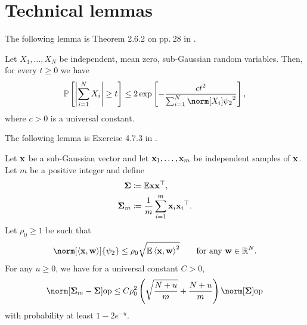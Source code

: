 \section{Technical lemmas}

The following lemma is Theorem 2.6.2 on pp.$\ $28 in \citet{vershynin2017high}.
\begin{lem}
\emph{ \label{lem:hoeffding} }Let $X_{1},\ldots,X_{N}$ be independent,
mean zero, sub-Gaussian random variables. Then, for every $t\geq0$
we have 
\[
\P\left[\left|\sum_{i=1}^{N}X_{i}\right|\geq t\right]\leq2\exp\left[-\frac{ct^{2}}{\sum_{i=1}^{N}\norm[X_{i}]{\psi_{2}}^{2}}\right],
\]
where $c>0$ is a universal constant.
\end{lem}
The following lemma is Exercise 4.7.3 in \citet{vershynin2017high}.
\begin{lem}
\emph{ }\label{lem:subg_cov_mat_bound} Let $\mathbf{x}$ be a sub-Gaussian
vector and let $\mathbf{x}_{1},\ldots,\mathbf{x}_{m}$ be independent samples of $\mathbf{x}$.
Let $m$ be a positive integer and define 
\begin{align*}
\boldsymbol{\Sigma} & \coloneqq\mathbb{E}\mathbf{x}\mathbf{x}{\displaystyle ^{\top}},\\
\boldsymbol{\Sigma}_{m} & \coloneqq\frac{1}{m}\sum_{i=1}^{m}\mathbf{x}_{i}\mathbf{x}_{i}{\displaystyle ^{\top}}.
\end{align*}
Let $\rho_{0}\ge1$ be such that 
\[
\norm[\left\langle \x,\w\right\rangle ]{\psi_{2}}\leq\rho_{0}\sqrt{\E\left\langle \x,\w\right\rangle ^{2}}\qquad\text{for any }\w\in\real^{N}.
\]
For any $u\geq0$, we have for a universal constant $C>0$, 
\[
\opnorm{\boldsymbol{\Sigma}_{m}-\boldsymbol{\Sigma}}\leq C\rho_{0}^{2}\left(\sqrt{\frac{N+u}{m}}+\frac{N+u}{m}\right)\opnorm{\boldsymbol{\Sigma}}
\]
with probability at least $1-2e^{-u}$.
\end{lem}

